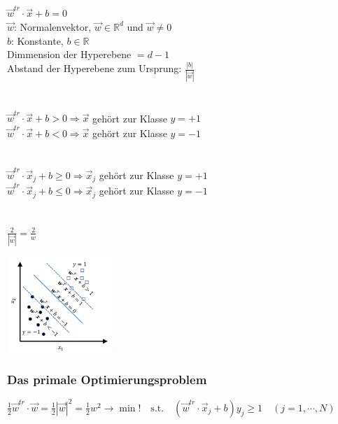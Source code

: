\begin{minipage}[]{0.56\columnwidth}
    \\
    $\boxed{\vec{w}^{tr}\cdot\vec{x}+b=0}$ \\
    $\vec{w}$: Normalenvektor, $\vec{w} \in \mathbb{R}^d$ und $\vec{w} \neq 0$\\
    $b$: Konstante, $b \in \mathbb{R}$\\
    Dimmension der Hyperebene $= d-1$\\
    Abstand der Hyperebene zum Ursprung: $\frac{\left\lvert b \right\rvert }{\left\lvert \vec{w}\right\rvert }$\\\\
    \\
    $\boxed{\vec{w}^{tr}\cdot\vec{x}+b>0} \Rightarrow \vec{x} $ gehört zur Klasse $y = +1$\\
    $\boxed{\vec{w}^{tr}\cdot\vec{x}+b<0} \Rightarrow \vec{x} $ gehört zur Klasse $y = -1$\\\\
    \\
    $\boxed{\vec{w}^{tr}\cdot\vec{x}_j+b \geq 0} \Rightarrow \vec{x}_j $ gehört zur Klasse $y = +1$\\
    $\boxed{\vec{w}^{tr}\cdot\vec{x}_j+b\leq 0} \Rightarrow \vec{x}_j $ gehört zur Klasse $y = -1$\\\\
    \\
    $\boxed{\frac{2}{\left\lvert \vec{w}\right\rvert }=\frac{2}{w}}$
\end{minipage}\hfill
\begin{minipage}[t]{0.4\columnwidth}
    \includegraphics[width=4cm]{images/7_model_values.png}
\end{minipage}

\subsubsection{Das primale Optimierungsproblem}
$\boxed{\frac12\vec{w}^{tr}\cdot\vec{w}=\frac12\left|\vec{w}\right|^2=\frac12w^2\to\min!\quad\mathrm{s.t.}\quad\left(\vec{w}^{tr}\cdot\vec{x}_j+b\right)y_j\geq1\quad\left(j=1,\cdots,N\right)}$

